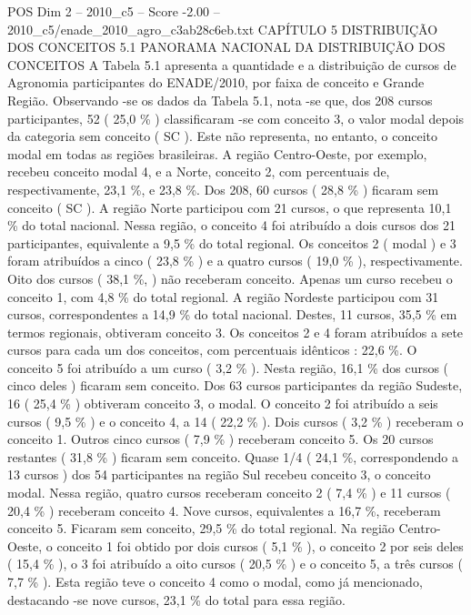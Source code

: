 \begin{textsample}{POS Dim 2 – 2010\_c5 – Score -2.00 – 2010\_c5/enade\_2010\_agro\_c3ab28c6eb.txt}  \label{ex:f2_pos_332}
CAPÍTULO 5 DISTRIBUIÇÃO DOS CONCEITOS 5.1 PANORAMA NACIONAL DA DISTRIBUIÇÃO DOS CONCEITOS A Tabela 5.1 apresenta a quantidade e a distribuição de cursos de Agronomia participantes do ENADE/2010, por faixa de conceito e Grande Região.
Observando -se os dados da Tabela 5.1, nota -se que, dos 208 cursos participantes, 52 ( 25,0 \% ) classificaram -se com conceito 3, o valor modal depois da categoria sem conceito ( SC ).
Este não representa, no entanto, o conceito modal em todas as regiões brasileiras.
A região Centro-Oeste, por exemplo, recebeu conceito modal 4, e a Norte, conceito 2, com percentuais de, respectivamente, 23,1 \%, e 23,8 \%.
Dos 208, 60 cursos ( 28,8 \% ) ficaram sem conceito ( SC ).
A região Norte participou com 21 cursos, o que representa 10,1 \% do total nacional.
Nessa região, o conceito 4 foi atribuído a dois cursos dos 21 participantes, equivalente a 9,5 \% do total regional.
Os conceitos 2 ( modal ) e 3 foram atribuídos a cinco ( 23,8 \% ) e a quatro cursos ( 19,0 \% ), respectivamente.
Oito dos cursos ( 38,1 \%, ) não receberam conceito.
Apenas um curso recebeu o conceito 1, com 4,8 \% do total regional.
A região Nordeste participou com 31 cursos, correspondentes a 14,9 \% do total nacional.
Destes, 11 cursos, 35,5 \% em termos regionais, obtiveram conceito 3.
Os conceitos 2 e 4 foram atribuídos a sete cursos para cada um dos conceitos, com percentuais idênticos : 22,6 \%.
O conceito 5 foi atribuído a um curso ( 3,2 \% ).
Nesta região, 16,1 \% dos cursos ( cinco deles ) ficaram sem conceito.
Dos 63 cursos participantes da região Sudeste, 16 ( 25,4 \% ) obtiveram conceito 3, o modal.
O conceito 2 foi atribuído a seis cursos ( 9,5 \% ) e o conceito 4, a 14 ( 22,2 \% ).
Dois cursos ( 3,2 \% ) receberam o conceito 1.
Outros cinco cursos ( 7,9 \% ) receberam conceito 5.
Os 20 cursos restantes ( 31,8 \% ) ficaram sem conceito.
Quase 1/4 ( 24,1 \%, correspondendo a 13 cursos ) dos 54 participantes na região Sul recebeu conceito 3, o conceito modal.
Nessa região, quatro cursos receberam conceito 2 ( 7,4 \% ) e 11 cursos ( 20,4 \% ) receberam conceito 4.
Nove cursos, equivalentes a 16,7 \%, receberam conceito 5.
Ficaram sem conceito, 29,5 \% do total regional.
Na região Centro-Oeste, o conceito 1 foi obtido por dois cursos ( 5,1 \% ), o conceito 2 por seis deles ( 15,4 \% ), o 3 foi atribuído a oito cursos ( 20,5 \% ) e o conceito 5, a três cursos ( 7,7 \% ).
Esta região teve o conceito 4 como o modal, como já mencionado, destacando -se nove cursos, 23,1 \% do total para essa região.

\end{textsample}
